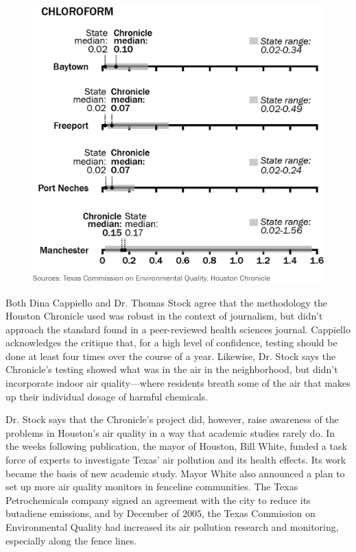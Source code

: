     \begin{figure}
    \includegraphics{images/HoustonChronicleChloroform.png}
    \end{figure}

Both Dina Cappiello and Dr. Thomas Stock agree that the methodology
the Houston Chronicle used was robust in the context of journalism, but
didn't approach the standard found in a peer-reviewed health sciences
journal. Cappiello acknowledges the critique that, for a high level of confidence,
testing should be done at least four times over the course of a year.
Likewise, Dr. Stock says the Chronicle's testing showed what was in the air in the neighborhood, but didn't incorporate indoor air quality—where residents breath some of the air that makes up their individual dosage of
harmful chemicals.

Dr. Stock says that the Chronicle's project did, however, raise awareness of
the problems in Houston's air quality in a way that academic studies rarely
do. In the weeks following publication, the mayor of Houston, Bill White,
funded a task force of experts to investigate Texas' air pollution and its
health effects. Its work became the basis of new academic study. Mayor
White also announced a plan to set up more air quality monitors in fenceline
communities. The Texas Petrochemicals company signed an agreement
with the city to reduce its butadiene emissions, and by December of 2005,
the Texas Commission on Environmental Quality had increased its air pollution
research and monitoring, especially along the fence lines.

